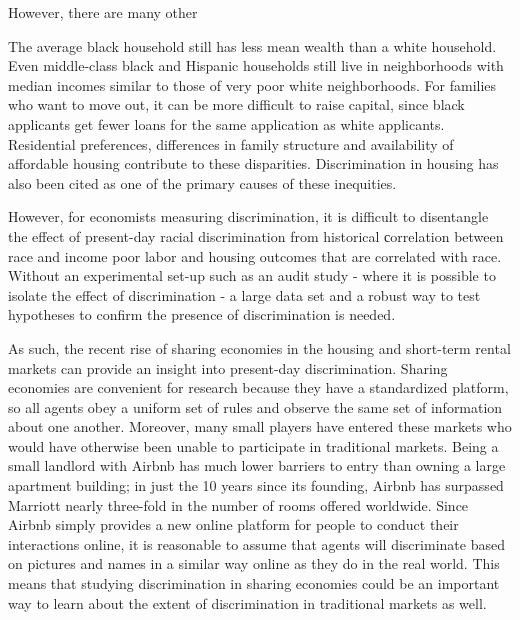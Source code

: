 However, there are many other 

The average black household still has less mean wealth than a white household.\cite{oliver} Even middle-class black and Hispanic households still live in neighborhoods with median incomes similar to those of very poor white neighborhoods.\cite{reardon} For families who want to move out, it can be more difficult to raise capital, since black applicants get fewer loans for the same application as white applicants.\cite{pope} Residential preferences, differences in family structure and availability of affordable housing contribute to these disparities.\cite{krysan} Discrimination in housing has also been cited as one of the primary causes of these inequities. 

However, for economists measuring discrimination, it is difficult to disentangle the effect of present-day racial discrimination from historical сorrelation between race and income poor labor and housing outcomes that are correlated with race. Without an experimental set-up such as an audit study - where it is possible to isolate the effect of discrimination - a large data set and a robust way to test hypotheses to confirm the presence of discrimination is needed.

As such, the recent rise of sharing economies in the housing and short-term rental markets can provide an insight into present-day discrimination. Sharing economies are convenient for research because they have a standardized platform, so all agents obey a uniform set of rules and observe the same set of information about one another. Moreover, many small players have entered these markets who would have otherwise been unable to participate in traditional markets. Being a small landlord with Airbnb has much lower barriers to entry than owning a large apartment building; in just the 10 years since its founding, Airbnb has surpassed Marriott nearly three-fold in the number of rooms offered worldwide.\cite{sharing} Since Airbnb simply provides a new online platform for people to conduct their interactions online, it is reasonable to assume that agents will discriminate based on pictures and names in a similar way online as they do in the real world. This means that studying discrimination in sharing economies could be an important way to learn about the extent of discrimination in traditional markets as well. 

